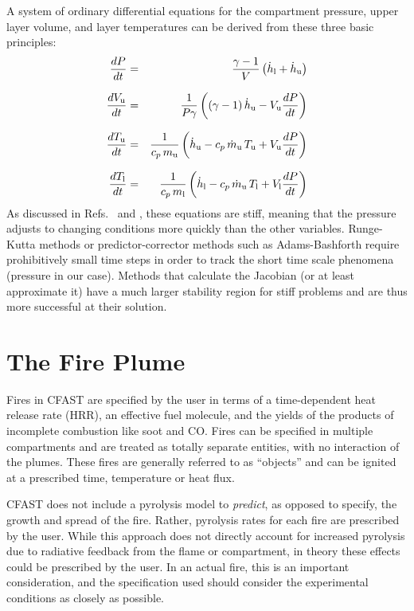 \ee
A system of ordinary differential equations for the compartment pressure, upper layer volume, and layer temperatures can be derived from these three basic principles:
\begin{eqnarray}
\frac{d {P}}{dt} &=& \frac{{\gamma-1}}{{V}} \left( \dot{h}_{\rm l} + \dot{h}_{\rm u} \right)  \\[.1in]
\frac{d {V_{\rm u}}}{dt} &=& \frac{1}{P \gamma} \left( (\gamma-1) \, \dot{h}_{\rm u} - V_{\rm u} \frac{d {P}}{dt} \right) \\[.1in]
\frac{d {T_{\rm u}}}{dt} &=& \frac{1}{c_p \, m_{\rm u}} \left( \dot{h}_{\rm u} - c_p \, \dot{m}_{\rm u} \, T_{\rm u} + V_{\rm u} \frac{d {P}}{dt} \right) \\[.1in]
\frac{d {T_{\rm l}}}{dt} &=& \frac{1}{c_p \, m_{\rm l}} \left( \dot{h}_{\rm l} - c_p \, \dot{m}_{\rm u} \, T_{\rm l} + V_{\rm l} \frac{d {P}}{dt} \right)
\end{eqnarray}
As discussed in Refs.~\cite{Forney:1994} and \cite{Rehm:1992}, these equations are stiff, meaning that the pressure adjusts to changing conditions more quickly than the other variables. Runge-Kutta methods or predictor-corrector methods such as Adams-Bashforth require prohibitively small time steps in order to track the short time scale phenomena (pressure in our case). Methods that calculate the Jacobian (or at least approximate it) have a much larger stability region for stiff problems and are thus more successful at their solution.





\chapter{The Fire Plume}
\label{sec:TheFire}

Fires in CFAST are specified by the user in terms of a time-dependent heat release rate (HRR), an effective fuel molecule, and the yields of the products of incomplete combustion like soot and CO. Fires can be specified in multiple compartments and are treated as totally separate entities, with no interaction of the plumes. These fires are generally referred to as ``objects'' and can be ignited at a prescribed time, temperature or heat flux.

CFAST does not include a pyrolysis model to {\em predict}, as opposed to specify, the growth and spread of the fire. Rather, pyrolysis rates for each fire are prescribed by the user. While this approach does not directly account for increased pyrolysis due to radiative feedback from the flame or compartment, in theory these effects could be prescribed by the user. In an actual fire, this is an important consideration, and the specification used should consider the experimental conditions as closely as possible.

